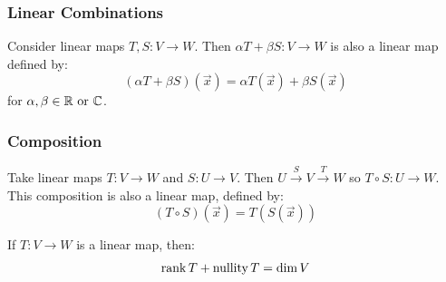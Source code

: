 \documentclass[../main.tex]{subfiles}
\begin{document}
\subsubsection{Linear Combinations}
Consider linear maps $T, S: V \to W$.
Then $\alpha T + \beta S: V \to W$ is also a linear map defined by:
\[
  (\alpha T + \beta S)(\vec{x}) = \alpha T(\vec{x}) + \beta S(\vec{x})
\]
for $\alpha, \beta \in \mathbb{R} \text{ or } \mathbb{C}$.
\subsubsection{Composition}
Take linear maps $T: V \to W$ and $S: U \to V$.
Then $U \xrightarrow{S} V \xrightarrow{T} W$ so $T \circ S: U \to W$.
This composition is also a linear map, defined by:
\[
  (T \circ S)(\vec{x}) = T(S(\vec{x}))
\]
\begin{theorem}
  If $T: V \to W$ is a linear map, then:
  \[
    \label{rankNullity}
    \operatorname{rank} T + \operatorname{nullity} T = \dim V
  \]
\end{theorem}
\end{document}
